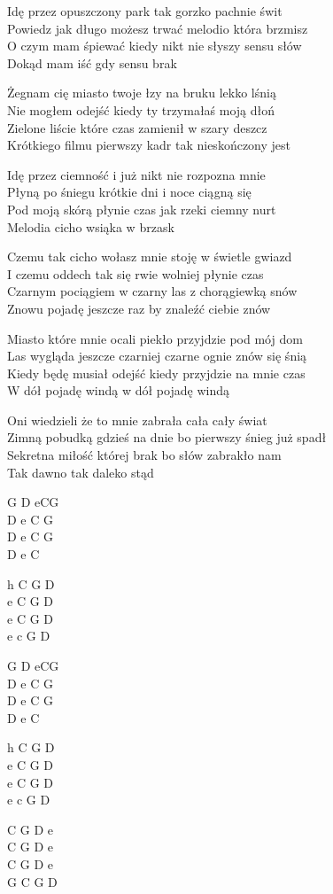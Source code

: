 \begin{text}
    Idę przez opuszczony park tak gorzko pachnie świt\\
    Powiedz jak długo możesz trwać melodio która brzmisz\\
    O czym mam śpiewać kiedy nikt nie słyszy sensu słów\\
    Dokąd mam iść gdy sensu brak

    Żegnam cię miasto twoje łzy na bruku lekko lśnią\\
    Nie mogłem odejść kiedy ty trzymałaś moją dłoń\\
    Zielone liście które czas zamienił w szary deszcz\\
    Krótkiego filmu pierwszy kadr tak nieskończony jest

    Idę przez ciemność i już nikt nie rozpozna mnie\\
    Płyną po śniegu krótkie dni i noce ciągną się\\
    Pod moją skórą płynie czas jak rzeki ciemny nurt\\
    Melodia cicho wsiąka w brzask

    Czemu tak cicho wołasz mnie stoję w świetle gwiazd\\
    I czemu oddech tak się rwie wolniej płynie czas\\
    Czarnym pociągiem w czarny las z chorągiewką snów\\
    Znowu pojadę jeszcze raz by znaleźć ciebie znów

    Miasto które mnie ocali piekło przyjdzie pod mój dom\\
    Las wygląda jeszcze czarniej czarne ognie znów się śnią\\
    Kiedy będę musiał odejść kiedy przyjdzie na mnie czas\\
    W dół pojadę windą w dół pojadę windą

    Oni wiedzieli że to mnie zabrała cała cały świat\\
    Zimną pobudką gdzieś na dnie bo pierwszy śnieg już spadł\\
    Sekretna miłość której brak bo słów zabrakło nam\\
    Tak dawno tak daleko stąd
\end{text}
\begin{chord}
    G D eCG\\
    D e C G\\
    D e C G\\
    D e C

    h C G D\\
    e C G D\\
    e C G D\\
    e c G D

    G D eCG\\
    D e C G\\
    D e C G\\
    D e C

    h C G D\\
    e C G D\\
    e C G D\\
    e c G D

    C G D e\\
    C G D e\\
    C G D e\\
    G C G D
\end{chord}